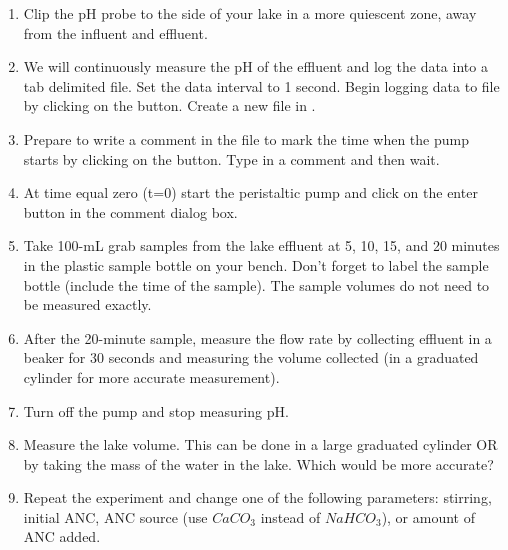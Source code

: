 \documentclass[letterpaper,10pt,english]{sphinxmanual}
\begin{document}
\begin{enumerate}
\item {} 
Clip the pH probe to the side of your lake in a more quiescent zone, away from the influent and effluent.

\item {} 
We will continuously measure the pH of the effluent and log the data into a tab delimited file. Set the data interval to 1 second. Begin logging data to file by clicking on the  button. Create a new file in .

\item {} 
Prepare to write a comment in the file to mark the time when the pump starts by clicking on the  button. Type in a comment and then wait.

\item {} 
At time equal zero (t=0) start the peristaltic pump and click on the enter button in the comment dialog box.

\item {} 
Take 100-mL grab samples from the lake effluent at 5, 10, 15, and 20 minutes in the plastic sample bottle on your bench.  Don’t forget to label the sample bottle (include the time of the sample). The sample volumes do not need to be measured exactly.

\item {} 
After the 20-minute sample, measure the flow rate by collecting effluent in a beaker for 30 seconds and measuring the volume collected (in a graduated cylinder for more accurate measurement).

\item {} 
Turn off the pump and stop measuring pH.

\item {} 
Measure the lake volume.  This can be done in a large graduated cylinder OR by taking the mass of the water in the lake.  Which would be more accurate?

\item {} 
Repeat the experiment and change one of the following parameters: stirring, initial ANC, ANC source (use \(CaCO_3\) instead of \(NaHCO_3\)), or amount of ANC added.

\end{enumerate}
\end{document}
